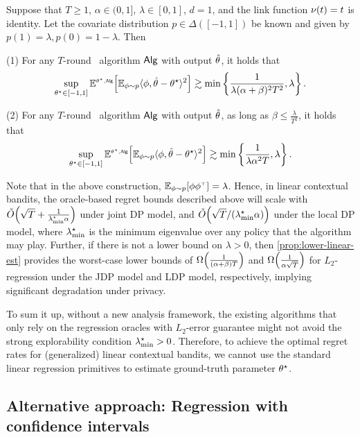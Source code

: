 \begin{proposition}\label{prop:lower-linear-est}
Suppose that $T\geq 1$, $\alpha\in(0,1]$, $\lambda\in[0,1]$, $d=1$, and the link function $\nu(t)=t$ is identity. Let the covariate distribution $p\in\Delta([-1,1])$ be known and given by $p(1)=\lambda, p(0)=1-\lambda$. Then

(1) For any $T$-round \JDP~algorithm $\mathsf{Alg}$ with output $\hat{\theta}$, it holds that
\begin{align*}
    \sup_{\theta^\star\in[-1,1]}\mathbb{E}^{{\scriptscriptstyle\theta^\star,\mathsf{Alg}}} {\left[  \mathbb{E}_{\phi\sim p}\langle \phi, \hat{\theta}-\theta^\star\rangle^2  \right]}\gtrsim \min\left\{\frac{1}{\lambda (\alpha+\beta)^2T^2},\lambda\right\}.
\end{align*}

(2) For any $T$-round \aLDP~algorithm $\mathsf{Alg}$ with output $\hat{\theta}$, as long as $\beta\leq \frac{\lambda}{T^2}$, it holds that
\begin{align*}
    \sup_{\theta^\star\in[-1,1]}\mathbb{E}^{{\scriptscriptstyle\theta^\star,\mathsf{Alg}}} {\left[  \mathbb{E}_{\phi\sim p}\langle \phi, \hat{\theta}-\theta^\star\rangle^2  \right]} \gtrsim \min\left\{\frac{1}{\lambda \alpha^2T},\lambda\right\}.
\end{align*}
\end{proposition}

Note that in the above construction, $\mathbb{E}_{\phi\sim p}{\left[ \phi \phi^{{\scriptscriptstyle\top}} \right]}=\lambda$. Hence, in linear contextual bandits, the oracle-based regret bounds described above will scale with $\tilde{O}{\left( \sqrt{T}+\frac{1}{\lambda_{\min}^\star \alpha} \right)}$ under joint DP model, and $\tilde{O}{\left( \sqrt{T}/(\lambda_{\min}^\star \alpha) \right)}$ under the local DP model, where $\lambda_{\min}^\star$ is the minimum eigenvalue over any policy that the algorithm may play. %
Further, if there is not a lower bound on $\lambda>0$, then \cref{prop:lower-linear-est}
provides the worst-case lower bounds of $\Omega{\left( \frac{1}{(\alpha+\beta)T} \right)}$ and $\Omega{\left( \frac{1}{\alpha\sqrt{T}} \right)}$ for $L_2$-regression under the JDP model and LDP model, respectively, implying significant degradation under privacy.

To sum it up, without a new analysis framework, the existing algorithms that only rely on the regression oracles with $L_2$-error guarantee might not avoid the strong explorability condition $\lambda_{\min}^\star>0$. 
Therefore, to achieve the optimal regret rates for (generalized) linear contextual bandits, we cannot use the standard linear regression primitives to estimate ground-truth parameter $\theta^\star$. 

\subsection{Alternative approach: Regression with confidence intervals}\label{ssec:L1-motivation}


